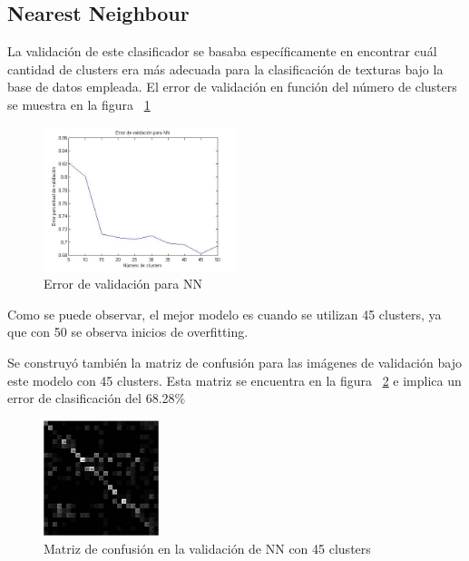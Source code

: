 \documentclass[10pt,twocolumn,letterpaper]{article}
\begin{document}
\subsection{Nearest Neighbour}
La validación de este clasificador se basaba específicamente en encontrar cuál cantidad de clusters era más adecuada para la clasificación de texturas bajo la base de datos empleada. El error de validación en función del número de clusters se muestra en la figura ~\ref{fig:errorValidacionInterseccion}

\begin{figure}[h]
    \centering
    \includegraphics[width=0.5\textwidth]{ErrorValidacionInterseccion.jpg}
    \caption{Error de validación para NN}
    \label{fig:errorValidacionInterseccion}
\end{figure}

Como se puede observar, el mejor modelo es cuando se utilizan 45 clusters, ya que con 50 se observa inicios de overfitting. 

Se construyó también la matriz de confusión para las imágenes de validación bajo este modelo con 45 clusters. Esta matriz se encuentra en la figura ~\ref{fig:ConfusionValidacionInterseccion} e implica un error de clasificación del 68.28\%

\begin{figure}[h]
    \centering
    \includegraphics[width=0.3\textwidth]{ConfusionValidacionInterseccion.jpg}
    \caption{Matriz de confusión en la validación de NN con 45 clusters}
    \label{fig:ConfusionValidacionInterseccion}
\end{figure}
\end{document}
